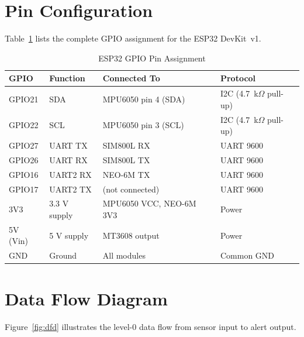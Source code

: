 \section{Pin Configuration}

Table~\ref{tab:pins} lists the complete GPIO assignment for the ESP32 DevKit~v1.

\begin{table}[H]
\centering
\caption{ESP32 GPIO Pin Assignment}
\label{tab:pins}
\begin{tabular}{llll}
\toprule
\textbf{GPIO} & \textbf{Function}   & \textbf{Connected To}   & \textbf{Protocol} \\
\midrule
GPIO21        & SDA                 & MPU6050 pin 4 (SDA)     & I2C (4.7~k$\Omega$ pull-up) \\
GPIO22        & SCL                 & MPU6050 pin 3 (SCL)     & I2C (4.7~k$\Omega$ pull-up) \\
GPIO27        & UART TX             & SIM800L RX              & UART 9600 \\
GPIO26        & UART RX             & SIM800L TX              & UART 9600 \\
GPIO16        & UART2 RX            & NEO-6M TX               & UART 9600 \\
GPIO17        & UART2 TX            & (not connected)         & UART 9600 \\
3V3           & 3.3 V supply        & MPU6050 VCC, NEO-6M 3V3 & Power \\
5V (Vin)      & 5 V supply          & MT3608 output           & Power \\
GND           & Ground              & All modules             & Common GND \\
\bottomrule
\end{tabular}
\end{table}

\section{Data Flow Diagram}

Figure~\ref{fig:dfd} illustrates the level-0 data flow from sensor input to alert
output.


